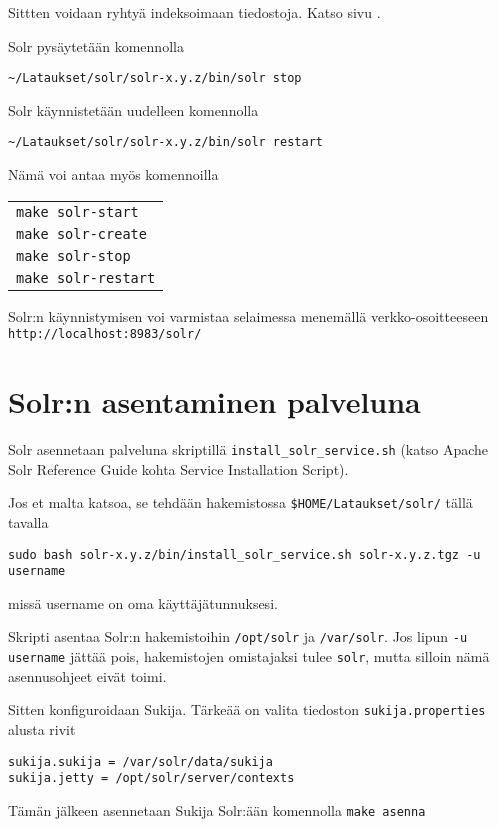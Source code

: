 \documentclass[12pt]{article}
\begin{document}
Sittten voidaan ryhtyä indeksoimaan tiedostoja. Katso sivu
.


Solr pysäytetään komennolla

\verb|~/Lataukset/solr/solr-x.y.z/bin/solr stop|

Solr käynnistetään uudelleen komennolla

\verb|~/Lataukset/solr/solr-x.y.z/bin/solr restart|


Nämä voi antaa myös komennoilla

\begin{tabular}{@{}l}
\verb|make solr-start| \\
\verb|make solr-create| \\
\verb|make solr-stop| \\
\verb|make solr-restart|
\end{tabular}

Solr:n käynnistymisen voi varmistaa selaimessa menemällä
verkko-osoitteeseen
\verb|http://localhost:8983/solr/|



\section*{Solr:n asentaminen palveluna}

Solr asennetaan palveluna skriptillä
\verb=install_solr_service.sh= 
(katso Apache Solr Reference Guide
kohta Service Installation Script).

Jos et malta katsoa, se tehdään hakemistossa
\verb=$HOME/Lataukset/solr/= tällä tavalla

{\footnotesize
\verb=sudo bash solr-x.y.z/bin/install_solr_service.sh solr-x.y.z.tgz -u username=
}

missä username on oma käyttäjätunnuksesi.

Skripti asentaa Solr:n hakemistoihin \verb=/opt/solr= ja
\verb=/var/solr=. Jos lipun \verb=-u username= jättää pois,
hakemistojen omistajaksi tulee \verb=solr=, mutta silloin nämä
asennusohjeet eivät toimi.

Sitten konfiguroidaan Sukija. Tärkeää on valita tiedoston
\verb=sukija.properties= alusta rivit

\begin{verbatim}
sukija.sukija = /var/solr/data/sukija
sukija.jetty = /opt/solr/server/contexts
\end{verbatim}


Tämän jälkeen asennetaan Sukija Solr:ään komennolla
\verb=make asenna=
\end{document}
